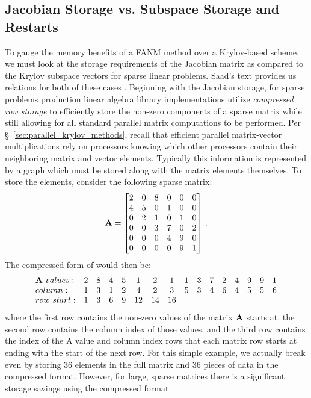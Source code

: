 \subsection{Jacobian Storage vs. Subspace Storage and Restarts}
\label{subsec:fanm_storage}
To gauge the memory benefits of a FANM method over a Krylov-based
scheme, we must look at the storage requirements of the Jacobian
matrix as compared to the Krylov subspace vectors for sparse linear
problems. Saad's text provides us relations for both of these cases
\citep{saad_iterative_2003}. Beginning with the Jacobian storage, for
sparse problems production linear algebra library implementations
utilize \textit{compressed row storage} to efficiently store the
non-zero components of a sparse matrix while still allowing for all
standard parallel matrix computations to be performed. Per
\S~\ref{sec:parallel_krylov_methods}, recall that efficient parallel
matrix-vector multiplications rely on processors knowing which other
processors contain their neighboring matrix and vector
elements. Typically this information is represented by a graph which
must be stored along with the matrix elements themselves. To store the
elements, consider the following sparse matrix:
\[
  \mathbf{A} =
  \begin{bmatrix}
    2 & 0 & 8 & 0 & 0 & 0 \\ 
    4 & 5 & 0 & 1 & 0 & 0 \\ 
    0 & 2 & 1 & 0 & 1 & 0 \\ 
    0 & 0 & 3 & 7 & 0 & 2 \\ 
    0 & 0 & 0 & 4 & 9 & 0 \\
    0 & 0 & 0 & 0 & 9 & 1 \\
  \end{bmatrix}\:.
\]
The compressed form of  would then be:
\[
  \begin{array}{lccccccccccccccc}
    \mathbf{A}\ values: & 2 & 8 & 4 & 5 & 1 & 2 & 1 & 1 & 3 & 7 & 2 & 4 & 9
    & 9 & 1 \\ column: & 1 & 3 & 1 & 2 & 4 & 2 & 3 & 5 & 3 & 4 & 6 & 4
    & 5 & 5 & 6 \\ row\ start: & 1 & 3 & 6 & 9 & 12 & 14 & 16 \\
  \end{array}
\]
where the first row contains the non-zero values of the matrix
$\mathbf{A}$ starts at, the second row contains the column index of those
values, and the third row contains the index of the A value and column
index rows that each matrix row starts at ending with the start of the
next row. For this simple example, we actually break even by storing
36 elements in the full matrix and 36 pieces of data in the compressed
format. However, for large, sparse matrices there is a significant
storage savings using the compressed format.

